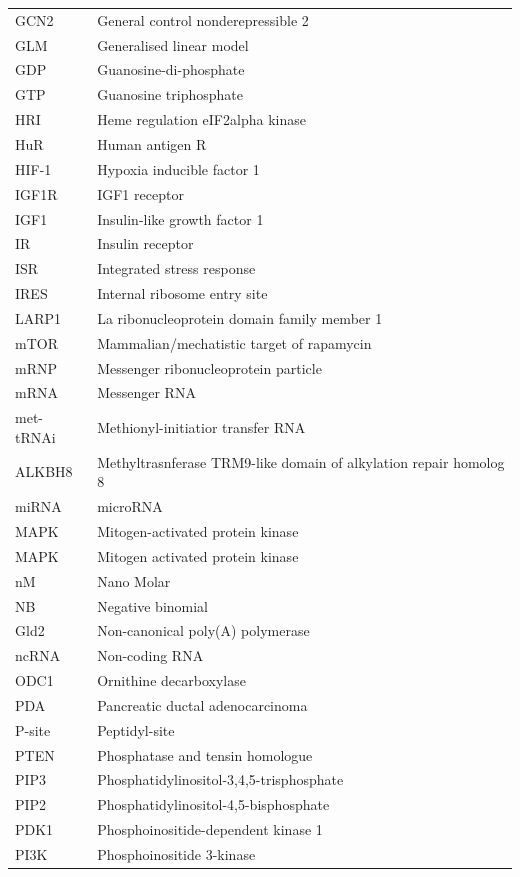 \documentclass[12pt,openany]{book}
\begin{document}
\begin{longtable}{ll}
GCN2 & General control nonderepressible 2\\
\addlinespace
GLM & Generalised linear model\\
GDP & Guanosine-di-phosphate\\
GTP & Guanosine triphosphate\\
HRI & Heme regulation eIF2alpha kinase\\
HuR & Human antigen R\\
\addlinespace
HIF-1 & Hypoxia inducible factor 1\\
IGF1R & IGF1 receptor\\
IGF1 & Insulin-like growth factor 1\\
IR & Insulin receptor\\
ISR & Integrated stress response\\
\addlinespace
IRES & Internal ribosome entry site\\
LARP1 & La ribonucleoprotein domain family member 1\\
mTOR & Mammalian/mechatistic target of rapamycin\\
mRNP & Messenger ribonucleoprotein particle\\
mRNA & Messenger RNA\\
\addlinespace
met-tRNAi & Methionyl-initiatior transfer RNA\\
ALKBH8 & Methyltrasnferase TRM9-like domain of alkylation repair homolog 8\\
miRNA & microRNA\\
MAPK & Mitogen-activated protein
kinase\\
MAPK & Mitogen activated protein kinase\\
\addlinespace
nM & Nano Molar\\
NB & Negative binomial\\
Gld2 & Non-canonical poly(A) polymerase\\
ncRNA & Non-coding RNA\\
ODC1 & Ornithine decarboxylase\\
\addlinespace
PDA & Pancreatic ductal adenocarcinoma\\
P-site & Peptidyl-site\\
PTEN & Phosphatase and tensin homologue\\
PIP3 & Phosphatidylinositol-3,4,5-trisphosphate\\
PIP2 & Phosphatidylinositol-4,5-bisphosphate\\
\addlinespace
PDK1 & Phosphoinositide-dependent kinase 1\\
PI3K & Phosphoinositide 3-kinase\\

\end{longtable}
\end{document}
